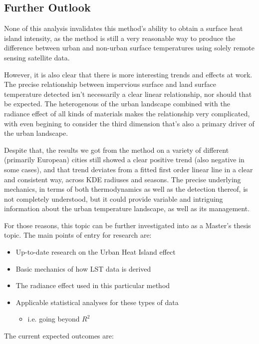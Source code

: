 \documentclass{article}
\begin{document}
\subsection{Further Outlook}
None of this analysis invalidates this method's ability to obtain a surface heat island intensity, as the method is still a very reasonable way to produce the difference between urban and non-urban surface temperatures using solely remote sensing satellite data.

However, it is also clear that there is more interesting trends and effects at work. The precise relationship between impervious surface and land surface temperature detected isn't necessarily a clear linear relationship, nor should that be expected. The heterogenous of the urban landscape combined with the radiance effect of all kinds of materials makes the relationship very complicated, with even begining to consider the third dimension that's also a primary driver of the urban landscape.

Despite that, the results we got from the method on a variety of different (primarily European) cities still showed a clear positive trend (also negative in some cases), and that trend deviates from a fitted first order linear line in a clear and consistent way, across KDE radiuses and seasons. The precise underlying mechanics, in terms of both thermodynamics as well as the detection thereof, is not completely understood, but it could provide variable and intriguing information about the urban temperature landscape, as well as its management.

For those reasons, this topic can be further investigated into as a Master's thesis topic. The main points of entry for research are:

\begin{itemize}
    \item Up-to-date research on the Urban Heat Island effect
    \item Basic mechanics of how LST data is derived
    \item The radiance effect used in this particular method
    \item Applicable statistical analyses for these types of data
    \begin{itemize}
        \item i.e. going beyond $R^2$
    \end{itemize}
\end{itemize}



The current expected outcomes are:
\end{document}

